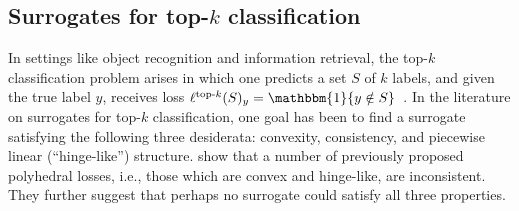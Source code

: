 \documentclass[11pt]{article}
\newcommand{\Comments}{1}
\newcommand{\mynote}[2]{\ifnum\Comments=1\textcolor{#1}{#2}\fi}
\newcommand{\mytodo}[2]{\ifnum\Comments=1%
  \todo[linecolor=#1!80!black,backgroundcolor=#1,bordercolor=#1!80!black]{#2}\fi}
\newcommand{\raft}[1]{\mytodo{green!20!white}{RF: #1}}
\newcommand{\jessie}[1]{\mynote{teal}{[JF: #1]}}
\newcommand{\jessiet}[1]{\mytodo{teal!20!white}{JF: #1}}
\newcommand{\simplex}{\Delta_\Y}
\newcommand{\Y}{\mathcal{Y}}
\newcommand{\ones}{\mathbbm{1}}
\newcommand{\elltopk}{\ell^{\text{top-$k$}}}
\begin{document}
\subsection{Surrogates for top-$k$ classification}
\label{sec:top-k}
In settings like object recognition and information retrieval, the top-$k$ classification problem arises in which one predicts a set $S$ of $k$ labels, and given the true label $y$, receives loss $\elltopk(S)_y = \ones\{y\notin S\}$~\citep{lapin2015top, lapin2016loss, lapin2018analysis,yang2018consistency,berrada2018smooth,rastegari2011scalable,reddi2019stochastic}.
In the literature on surrogates for top-$k$ classification, one goal has been to find a surrogate satisfying the following three desiderata: convexity, consistency, and piecewise linear (``hinge-like'') structure.
\citet{yang2018consistency} show that a number of previously proposed polyhedral losses, i.e., those which are convex and hinge-like, are inconsistent.
They further suggest that perhaps no surrogate could satisfy all three properties.
\end{document}
